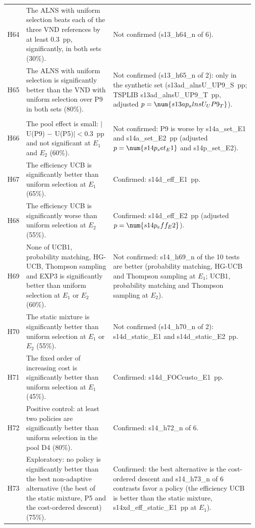 \begin{center}
\begin{longtable}{>{\raggedright\arraybackslash}p{0.9cm}>{\raggedright\arraybackslash}p{5.2cm}>{\raggedright\arraybackslash}p{8.5cm}}
H64 & The ALNS with uniform selection beats each of the three VND references by at least 0.3~pp, significantly, in both sets (30\%). & Not confirmed (\num{s13_h64_n} of 6). \\
H65 & The ALNS with uniform selection is significantly better than the VND with uniform selection over P9 in both sets (80\%). & Not confirmed (\num{s13_h65_n} of 2): only in the synthetic set (\num{s13ad_alnsU_UP9_S}~pp; TSPLIB \num{s13ad_alnsU_UP9_T}~pp, adjusted $p=\num{s13ap_alnsU_UP9_T}$). \\
\midrule
\multicolumn{3}{l}{\emph{Study 14, CVRPTW (log entry 116; committed before its data)}} \\
H66 & The pool effect is small: $|$U(P9) $-$ U(P5)$|<0.3$~pp and not significant at $E_1$ and $E_2$ (60\%). & Not confirmed: P9 is worse by \num{s14a_set_E1} and \num{s14a_set_E2}~pp (adjusted $p=\num{s14p_set_E1}$ and \num{s14p_set_E2}). \\
H67 & The efficiency UCB is significantly better than uniform selection at $E_1$ (65\%). & Confirmed: \num{s14d_eff_E1}~pp. \\
H68 & The efficiency UCB is significantly worse than uniform selection at $E_2$ (55\%). & Confirmed: \num{s14d_eff_E2}~pp (adjusted $p=\num{s14p_eff_E2}$). \\
H69 & None of UCB1, probability matching, HG-UCB, Thompson sampling and EXP3 is significantly better than uniform selection at $E_1$ or $E_2$ (60\%). & Not confirmed: \num{s14_h69_n} of the 10 tests are better (probability matching, HG-UCB and Thompson sampling at $E_1$; UCB1, probability matching and Thompson sampling at $E_2$). \\
H70 & The static mixture is significantly better than uniform selection at $E_1$ or $E_2$ (55\%). & Not confirmed (\num{s14_h70_n} of 2): \num{s14d_static_E1} and \num{s14d_static_E2}~pp. \\
H71 & The fixed order of increasing cost is significantly better than uniform selection at $E_1$ (45\%). & Confirmed: \num{s14d_FOCcusto_E1}~pp. \\
H72 & Positive control: at least two policies are significantly better than uniform selection in the pool D4 (80\%). & Confirmed: \num{s14_h72_n} of 6. \\
H73 & Exploratory: no policy is significantly better than the best non-adaptive alternative (the best of the static mixture, P5 and the cost-ordered descent) (75\%). & Confirmed: the best alternative is the cost-ordered descent and \num{s14_h73_n} of 6 contrasts favor a policy (the efficiency UCB is better than the static mixture, \num{s14xd_eff_static_E1}~pp at $E_1$). \\

\end{longtable}
\end{center}

